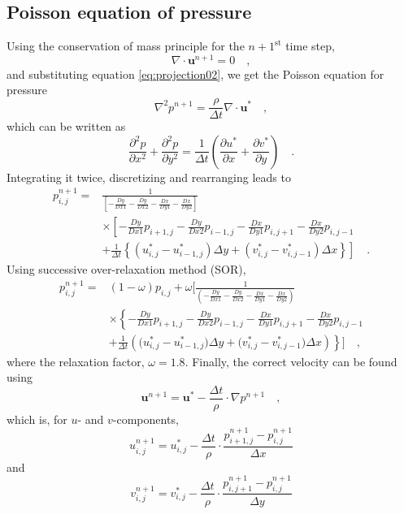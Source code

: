 \documentclass[12pt,a4paper,fleqn]{article}
\begin{document}
\subsection{Poisson equation of pressure}
Using the conservation of mass principle for the $n+1^{\text{st}}$ time step,
\begin{equation} \label{eq:continuity-n+1}
\nabla \cdot \mathbf{u}^{n+1} = 0 \quad ,
\end{equation}
and substituting equation \eqref{eq:projection02}, we get the Poisson equation for pressure
\begin{equation} \label{eq:poisson}
\nabla^2 p^{n+1} = \frac{\rho}{\Delta t}\nabla \cdot \mathbf{u}^* \quad ,
\end{equation}
which can be written as
\begin{equation} \label{eq:poisson-components}
\frac{\partial^2 p}{\partial x^2} + \frac{\partial^2 p}{\partial y^2}
= \frac{1}{\Delta t} \left(\frac{\partial u^*}{\partial x} + \frac{\partial v^*}{\partial y}\right) \quad .
\end{equation}
Integrating it twice, discretizing and rearranging leads to
\begin{align}
p_{i,j}^{n+1} =
&\frac{1}{\left[ - \frac{Dy}{Dx1} - \frac{Dy}{Dx2} - \frac{Dx}{Dy1} - \frac{Dx}{Dy2} \right]}
\nonumber \\
&\times
\left[
- \frac{Dy}{Dx1}p_{i+1,j} - \frac{Dy}{Dx2}p_{i-1,j} - \frac{Dx}{Dy1}p_{i,j+1} - \frac{Dx}{Dy2}p_{i,j-1}
\right. \nonumber \\
&\left.
+ \frac{1}{\Delta t}\left\{
\left(u^*_{i,j}-u^*_{i-1,j}\right) \Delta y
+ \left(v^*_{i,j}-v^*_{i,j-1}\right) \Delta x
\right\}
\right]
\quad .
\end{align}
Using successive over-relaxation method (SOR),
\begin{align}
p_{i,j}^{n+1} =& \left(1 - \omega\right)p_{i,j} + \omega
\Bigg[
\frac{1}{\left( - \frac{Dy}{Dx1} - \frac{Dy}{Dx2} - \frac{Dx}{Dy1} - \frac{Dx}{Dy2} \right)}
\nonumber \\
&\times
\left\{
- \frac{Dy}{Dx1}p_{i+1,j} - \frac{Dy}{Dx2}p_{i-1,j} - \frac{Dx}{Dy1}p_{i,j+1} - \frac{Dx}{Dy2}p_{i,j-1}
\right. \nonumber \\
&\left.
+ \frac{1}{\Delta t}\left(
\big(u^*_{i,j}-u^*_{i-1,j}\big) \Delta y
+ \big(v^*_{i,j}-v^*_{i,j-1}\big) \Delta x
\right)
\right\}
\Bigg]
\quad ,
\end{align}
where the relaxation factor, $\omega = 1.8$.
Finally, the correct velocity can be found using
\begin{equation}
\mathbf{u}^{n+1} = \mathbf{u}^* - \frac{\Delta t}{\rho}\cdot \nabla p^{n+1} \quad ,
\end{equation}
which is, for $u$- and $v$-components,
\begin{equation}
u^{n+1}_{i,j} = u^*_{i,j} - \frac{\Delta t}{\rho}\cdot \frac{p_{i+1,j}^{n+1} - p_{i,j}^{n+1}}{\Delta x}
\end{equation}
and
\begin{equation}
v^{n+1}_{i,j} = v^*_{i,j} - \frac{\Delta t}{\rho}\cdot \frac{p_{i,j+1}^{n+1} - p_{i,j}^{n+1}}{\Delta y}
\end{equation}
\end{document}
